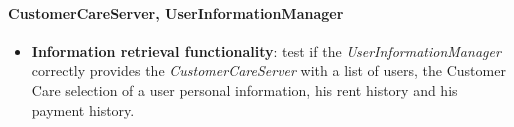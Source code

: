 \paragraph{CustomerCareServer, UserInformationManager}
\begin{itemize}
\item \textbf{Information retrieval functionality}: test if the \emph{UserInformationManager} correctly provides the \emph{CustomerCareServer} with a list of users, the Customer Care selection of a user personal information, his rent history and his payment history.
\end{itemize}











